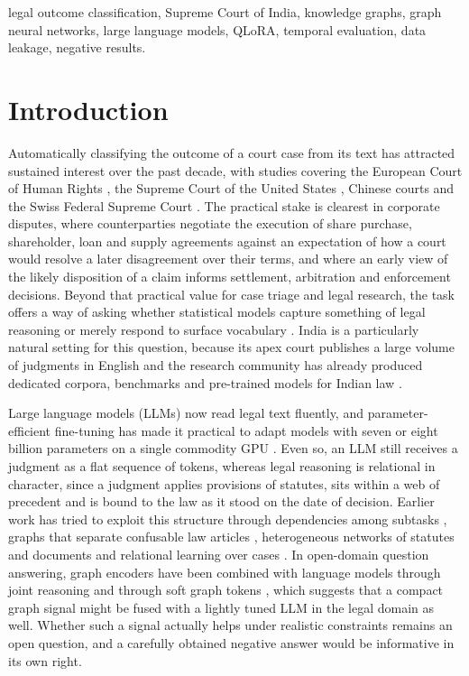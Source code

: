 \documentclass[journal]{IEEEtran}
\begin{document}
\begin{IEEEkeywords}
legal outcome classification, Supreme Court of India, knowledge graphs, graph neural networks, large language models, QLoRA, temporal evaluation, data leakage, negative results.
\end{IEEEkeywords}

\section{Introduction}
Automatically classifying the outcome of a court case from its text has attracted sustained interest over the past decade, with studies covering the European Court of Human Rights \cite{r1,r2,r3}, the Supreme Court of the United States \cite{r4}, Chinese courts \cite{r5,r6} and the Swiss Federal Supreme Court \cite{r7}. The practical stake is clearest in corporate disputes, where counterparties negotiate the execution of share purchase, shareholder, loan and supply agreements against an expectation of how a court would resolve a later disagreement over their terms, and where an early view of the likely disposition of a claim informs settlement, arbitration and enforcement decisions. Beyond that practical value for case triage and legal research, the task offers a way of asking whether statistical models capture something of legal reasoning or merely respond to surface vocabulary \cite{r8,r9}. India is a particularly natural setting for this question, because its apex court publishes a large volume of judgments in English and the research community has already produced dedicated corpora, benchmarks and pre-trained models for Indian law \cite{r10,r11,r12}.

Large language models (LLMs) now read legal text fluently, and parameter-efficient fine-tuning has made it practical to adapt models with seven or eight billion parameters on a single commodity GPU \cite{r13,r14}. Even so, an LLM still receives a judgment as a flat sequence of tokens, whereas legal reasoning is relational in character, since a judgment applies provisions of statutes, sits within a web of precedent and is bound to the law as it stood on the date of decision. Earlier work has tried to exploit this structure through dependencies among subtasks \cite{r5}, graphs that separate confusable law articles \cite{r15}, heterogeneous networks of statutes and documents \cite{r16,r17} and relational learning over cases \cite{r18}. In open-domain question answering, graph encoders have been combined with language models through joint reasoning \cite{r19,r20} and through soft graph tokens \cite{r21,r22,r23}, which suggests that a compact graph signal might be fused with a lightly tuned LLM in the legal domain as well. Whether such a signal actually helps under realistic constraints remains an open question, and a carefully obtained negative answer would be informative in its own right.
\end{document}

